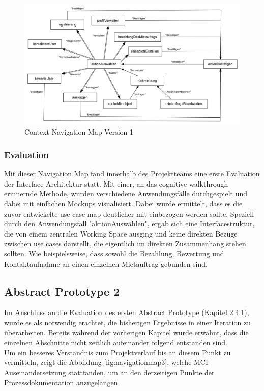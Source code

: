 \begin{figure}[H]
\includegraphics[width=1\textwidth]{./images/navigationmap1.png}
\caption{Context Navigation Map Version 1}
\label{fig:navigationmap1}
\end{figure}

\subsubsection{Evaluation}
Mit dieser Navigation Map fand innerhalb des Projektteams eine erste Evaluation der Interface Architektur statt. Mit einer, an das cognitive walkthrough erinnernde Methode, wurden verschiedene Anwendungsfälle durchgespielt und dabei mit einfachen Mockups visualisiert. Dabei wurde ermittelt, dass es die zuvor entwickelte use case map deutlicher mit einbezogen werden sollte. Speziell durch den Anwendungsfall "aktionAuswählen", ergab sich eine Interfacestruktur, die von einem zentralen Working Space ausging und keine direkten Bezüge zwischen use cases darstellt, die eigentlich im direkten Zusammenhang stehen sollten. Wie beispielsweise, dass sowohl die Bezahlung, Bewertung und Kontaktaufnahme an einen einzelnen Mietauftrag gebunden sind.\\

\newpage
\subsection{Abstract Prototype 2}
Im Anschluss an die Evaluation des ersten Abstract Prototype (Kapitel 2.4.1), wurde es als notwendig erachtet, die bisherigen Ergebnisse in einer Iteration zu überarbeiten. Bereits während der vorherigen Kapitel wurde erwähnt, dass die einzelnen Abschnitte nicht zeitlich aufeinander folgend entstanden sind. \\
Um ein besseres Verständnis zum Projektverlauf bis an diesem Punkt zu vermitteln, zeigt die Abbildung \ref{fig:navigationmap3}, welche MCI Auseinandersetzung stattfanden, um an den derzeitigen Punkte der Prozessdokumentation anzugelangen.

